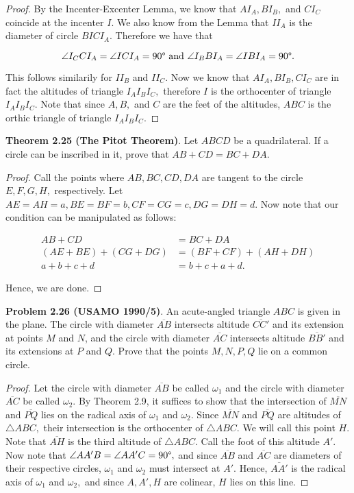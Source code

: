 \documentclass[letterpaper,oneside]{book}
\begin{document}
  \begin{proof}  By the Incenter-Excenter Lemma, we know that $AI_A, BI_B,$ and $CI_C$ coincide at the incenter $I$. We also know from the Lemma that $II_A$ is the diameter of circle $BICI_A.$ Therefore we have that 

$$\angle {I_CCI_A} = \angle {ICI_A} =  90\degree \text{ and } \angle {I_BBI_A} = \angle {IBI_A} = 90\degree .$$

This follows similarily for $II_B$ and $II_C.$ Now we know that $AI_A, BI_B, CI_C$ are in fact the altitudes of triangle $I_AI_BI_C,$ therefore $I$ is the orthocenter of triangle $I_AI_BI_C.$ Note that since $A,B,$ and $C$ are the feet of the altitudes, $ABC$ is the orthic triangle of triangle $I_AI_BI_C.$ \end{proof}

  \textbf{Theorem 2.25 (The Pitot Theorem)}.   Let $ABCD$ be a quadrilateral. If a circle can be inscribed in it, prove that $AB + CD = BC + DA.$

  \begin{proof}  Call the points where $AB, BC, CD, DA$ are tangent to the circle $E, F, G, H,$ respectively. Let $AE = AH = a, BE = BF = b, CF = CG = c, DG = DH = d.$ Now note that our condition can be manipulated as follows:

\begin{align*}
    AB + CD &= BC + DA \\
    (AE + BE) + (CG + DG) &= (BF + CF) + (AH + DH)\\
    a + b + c + d &= b + c + a + d.
\end{align*}

Hence, we are done. \end{proof}

  \textbf{Problem 2.26 (USAMO 1990/5)}.   An acute-angled triangle $ABC$ is given in the plane. The circle with diameter $\overline{AB}$ intersects altitude $\overline{CC'}$ and its extension at points $M$ and $N$, and the circle with diameter $\overline{AC}$ intersects altitude $\overline{BB'}$ and its extensions at $P$ and $Q$. Prove that the points $M, N, P , Q$ lie on a common circle.

  \begin{proof}  Let the circle with diameter $\overline{AB}$ be called $\omega_1$ and the circle with diameter $\overline{AC}$ be called $\omega_2.$  By Theorem 2.9, it suffices to show that the intersection of $\overline{MN}$ and $\overline{PQ}$ lies on the radical axis of $\omega_1$ and $\omega_2.$ Since $\overline{MN}$ and $\overline{PQ}$ are altitudes of $\triangle ABC,$ their intersection is the orthocenter of $\triangle ABC.$ We will call this point $H.$ Note that $\overline{AH}$ is the third altitude of $\triangle ABC.$ Call the foot of this altitude $A'.$ Now note that $\angle AA'B = \angle AA'C = 90\degree,$ and since $\overline{AB}$ and $\overline{AC}$ are diameters of their respective circles, $\omega_1$ and $\omega_2$ must intersect at $A'.$ Hence, $\overline{AA'}$ is the radical axis of $\omega_1$ and $\omega_2,$ and since $A,A',H$ are colinear, $H$ lies on this line. \end{proof}
\end{document}
